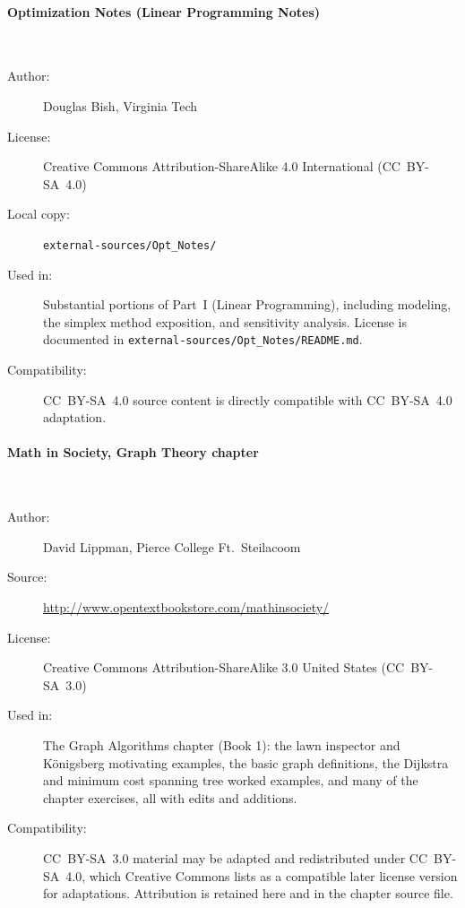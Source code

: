 \paragraph{Optimization Notes (Linear Programming Notes)}\hspace{0pt}\\[-0.6em]
\begin{description}
  \item[Author:] Douglas Bish, Virginia Tech
  \item[License:] Creative Commons Attribution-ShareAlike 4.0
    International (CC~BY-SA~4.0)
  \item[Local copy:] \texttt{external-sources/Opt\_Notes/}
  \item[Used in:] Substantial portions of Part~I (Linear Programming),
    including modeling, the simplex method exposition, and sensitivity
    analysis. License is documented in
    \texttt{external-sources/Opt\_Notes/README.md}.
  \item[Compatibility:] CC~BY-SA~4.0 source content is directly
    compatible with CC~BY-SA~4.0 adaptation.
\end{description}

\paragraph{Math in Society, Graph Theory chapter}\hspace{0pt}\\[-0.6em]
\begin{description}
  \item[Author:] David Lippman, Pierce College Ft.\ Steilacoom
  \item[Source:] \url{http://www.opentextbookstore.com/mathinsociety/}
  \item[License:] Creative Commons Attribution-ShareAlike 3.0 United
    States (CC~BY-SA~3.0)
  \item[Used in:] The Graph Algorithms chapter (Book 1): the lawn
    inspector and K\"onigsberg motivating examples, the basic graph
    definitions, the Dijkstra and minimum cost spanning tree worked
    examples, and many of the chapter exercises, all with edits and
    additions.
  \item[Compatibility:] CC~BY-SA~3.0 material may be adapted and
    redistributed under CC~BY-SA~4.0, which Creative Commons lists as
    a compatible later license version for adaptations. Attribution is
    retained here and in the chapter source file.
\end{description}

